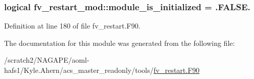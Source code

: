 \subsubsection[{module\-\_\-is\-\_\-initialized}]{\setlength{\rightskip}{0pt plus 5cm}logical fv\-\_\-restart\-\_\-mod\-::module\-\_\-is\-\_\-initialized = .F\-A\-L\-S\-E.\hspace{0.3cm}{\ttfamily [private]}}\label{classfv__restart__mod_acf880b4cfc12d08f29edb14fd1ca6a32}


Definition at line 180 of file fv\-\_\-restart.\-F90.



The documentation for this module was generated from the following file\-:\begin{DoxyCompactItemize}
\item 
/scratch2/\-N\-A\-G\-A\-P\-E/aoml-\/hafs1/\-Kyle.\-Ahern/acs\-\_\-master\-\_\-readonly/tools/\hyperlink{fv__restart_8F90}{fv\-\_\-restart.\-F90}\end{DoxyCompactItemize}
